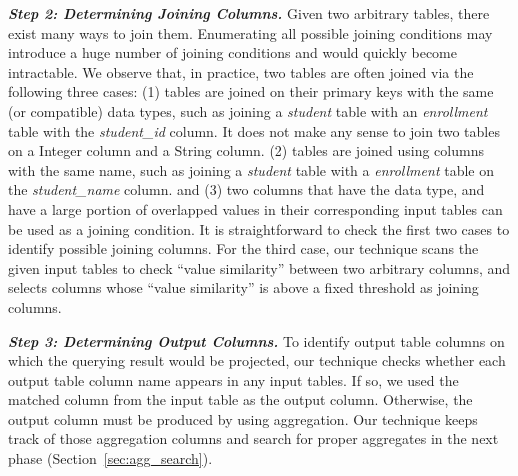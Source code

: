 \vspace{1mm}
\noindent\textit{\textbf{Step 2: Determining Joining Columns. }} Given two arbitrary tables, there exist many
ways to join them. Enumerating all possible joining conditions may introduce a huge number of joining
conditions and would quickly become intractable. We observe that, in practice, two tables are often joined via the following
three cases: (1) tables are joined on their primary keys with the same (or compatible) data types, such
as joining a \textit{student} table with an \textit{enrollment} table with the \textit{student\_id} column. It does not
make any sense to join two tables on a Integer column and a String column. (2) tables are joined
using columns with the same name, such as joining a \textit{student} table with a \textit{enrollment} table on the
\textit{student\_name} column. and (3) two columns that have the data type, and have a large portion of
overlapped values in their corresponding input tables can be used as a joining condition. It is straightforward to check the first 
two cases to identify possible joining columns. For the third case, our technique scans the given input tables to check ``value similarity''
between two arbitrary columns, and selects columns whose ``value similarity'' is above a fixed threshold as joining columns.

\vspace{1mm}
\noindent \textit{\textbf{Step 3: Determining Output Columns.}} To identify output table columns on
which the querying result would be projected, our technique checks whether each output
table column name appears in any input tables. If so, we used the matched column
from the input table as the output column. Otherwise, the output column
must be produced by using aggregation. Our technique keeps track of those aggregation columns
and search for proper aggregates in the next phase (Section~\ref{sec:agg_search}). 


\vspace{1mm}

